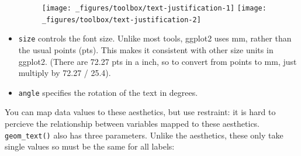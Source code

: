 \begin{itemize}
  \begin{figure}[H]
    \texttt{[image: \_figures/toolbox/text-justification-1]}%
    \texttt{[image: \_figures/toolbox/text-justification-2]}
  \end{figure}
\item
  \texttt{size} controls the font size. Unlike most tools, ggplot2 uses
  mm, rather than the usual points (pts). This makes it consistent with
  other size units in ggplot2. (There are 72.27 pts in a inch, so to
  convert from points to mm, just multiply by 72.27 / 25.4).
\item
  \texttt{angle} specifies the rotation of the text in degrees.
\end{itemize}

You can map data values to these aesthetics, but use restraint: it is
hard to percieve the relationship between variables mapped to these
aesthetics. \texttt{geom\_text()} also has three parameters. Unlike the
aesthetics, these only take single values so must be the same for all
labels:

